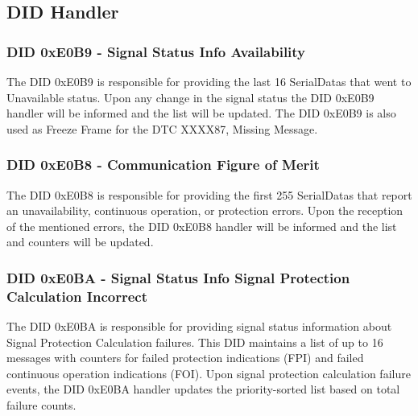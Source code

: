 
{      }

\subsection{DID Handler}
\label{subsection:DIDHandler}
\subsubsection{DID 0xE0B9 - Signal Status Info Availability}


The DID 0xE0B9 is responsible for providing the last 16 SerialDatas that went to Unavailable status. Upon any change in the signal status 
the DID 0xE0B9 handler will be informed and the list will be updated.
The DID 0xE0B9 is also used as Freeze Frame for the DTC XXXX87, Missing Message.

{ }

\subsubsection{DID 0xE0B8 - Communication Figure of Merit}


The DID 0xE0B8 is responsible for providing the first 255 SerialDatas that report an unavailability, continuous operation, or protection errors. 
Upon the reception of the mentioned errors, 
the DID 0xE0B8 handler will be informed and the list and counters will be updated.


{}

\subsubsection{DID 0xE0BA - Signal Status Info Signal Protection Calculation Incorrect}


The DID 0xE0BA is responsible for providing signal status information about Signal Protection Calculation failures. This DID maintains a list of up to 16 messages with counters for failed protection indications (FPI) and failed continuous operation indications (FOI). Upon signal protection calculation failure events, the DID 0xE0BA handler updates the priority-sorted list based on total failure counts.

